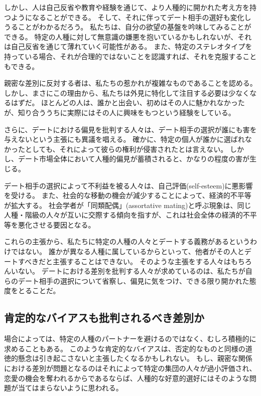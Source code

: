 \documentclass[paper=a4,book,openany]{jlreq}
\begin{document}
しかし、人は自己反省や教育や経験を通じて、より人種的に開かれた考え方を持つようになることができる。
そして、それに伴ってデート相手の選好も変化しうることがわかるだろう。
私たちは、自分の欲望の基盤を吟味してみることができる。
特定の人種に対して無意識の嫌悪を抱いているかもしれないが、それは自己反省を通じて薄れていく可能性がある。
また、特定のステレオタイプを持っている場合、それが合理的ではないことを認識すれば、それを克服することもできる。

親密な差別に反対する者は、私たちの惹かれが複雑なものであることを認める。
しかし、まさにこの理由から、私たちは外見に特化して注目する必要は少なくなるはずだ。
ほとんどの人は、誰かと出会い、初めはその人に魅かれなかったが、知り合ううちに実際にはその人に興味をもつという経験をしている。

さらに、デートにおける偏見を批判する人々は、デート相手の選択が誰にも害を与えないという主張にも異議を唱える。
確かに、特定の個人が誰かに選ばれなかったとしても、それによって彼らの権利が侵害されたとは言えない。
しかし、デート市場全体において人種的偏見が蓄積されると、かなりの程度の害が生じる\citep{lopez19:_sexual_racis_is}。

デート相手の選択によって不利益を被る人々は、自己評価(self-esteem)に悪影響を受ける。
また、社会的な移動の機会が減少することによって、経済的不平等が拡大する。
社会学者が「同類配偶」(assortative mating)と呼ぶ現象は、同じ人種・階級の人々が互いに交際する傾向を指すが、これは社会全体の経済的不平等を悪化させる要因となる\citep{milanovic19:_rich_like_me}。

これらの主張から、私たちに特定の人種の人々とデートする義務があるというわけではない。
誰かが異なる人種に属しているからといって、他者がその人とデートすべきだと主張することはできない。
そのような主張をする人々はもちろんいない。
デートにおける差別を批判する人々が求めているのは、私たちが自らのデート相手の選択について省察し、偏見に気をつけ、できる限り開かれた態度をとることだ。

\subsection{肯定的なバイアスも批判されるべき差別か}

場合によっては、特定の人種のパートナーを避けるのではなく、むしろ積極的に求めることもある。
このような肯定的なバイアスは、否定的なものと同様の道徳的懸念は引き起こさないと主張したくなるかもしれない。
もし、親密な関係における差別が問題となるのはそれによって特定の集団の人々が過小評価され、恋愛の機会を奪われるからであるならば、人種的な好意的選好にはそのような問題が当てはまらないように思われる。
\end{document}
